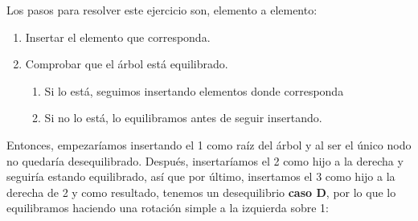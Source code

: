 \documentclass[10pt,a4paper,spanish]{report}
\begin{document}
\noindent
Los pasos para resolver este ejercicio son, elemento a elemento:
\begin{enumerate}
	\item Insertar el elemento que corresponda.
	\item Comprobar que el árbol está equilibrado.
	\begin{enumerate}
		\item Si lo está, seguimos insertando elementos donde corresponda
		\item Si no lo está, lo equilibramos antes de seguir insertando.
	\end{enumerate}
\end{enumerate}

\noindent
Entonces, empezaríamos insertando el 1 como raíz del árbol y al ser el único nodo no quedaría desequilibrado. Después, insertaríamos el 2 como hijo a la derecha y seguiría estando equilibrado, así que por último, insertamos el 3 como hijo a la derecha de 2 y como resultado, tenemos un desequilibrio \textbf{\textcolor[rgb]{0.3,0.4,0.8}{caso D}}, por lo que lo equilibramos haciendo una rotación simple a la izquierda sobre 1:
\end{document}

